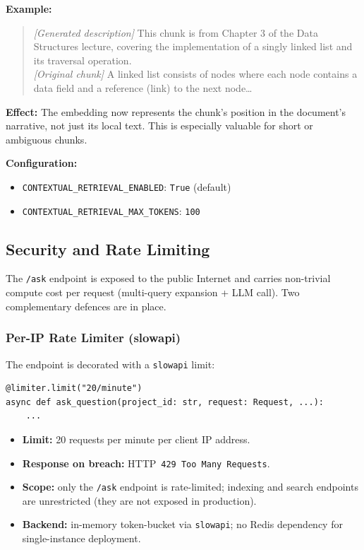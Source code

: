 \documentclass[12pt,a4paper]{article}
\begin{document}
\textbf{Example:}
\begin{quote}
\textit{[Generated description]} This chunk is from Chapter 3 of the Data Structures lecture, covering the implementation of a singly linked list and its traversal operation.\\[4pt]
\textit{[Original chunk]} A linked list consists of nodes where each node contains a data field and a reference (link) to the next node\ldots
\end{quote}

\textbf{Effect:} The embedding now represents the chunk's position in the document's narrative, not just its local text. This is especially valuable for short or ambiguous chunks.

\textbf{Configuration:}
\begin{itemize}
  \item \texttt{CONTEXTUAL\_RETRIEVAL\_ENABLED}: \texttt{True} (default)
  \item \texttt{CONTEXTUAL\_RETRIEVAL\_MAX\_TOKENS}: \texttt{100}
\end{itemize}

\subsection{Security and Rate Limiting}

The \texttt{/ask} endpoint is exposed to the public Internet and carries non-trivial compute cost per request (multi-query expansion + LLM call). Two complementary defences are in place.

\subsubsection*{Per-IP Rate Limiter (slowapi)}

The endpoint is decorated with a \texttt{slowapi} limit:

\begin{verbatim}
@limiter.limit("20/minute")
async def ask_question(project_id: str, request: Request, ...):
    ...
\end{verbatim}

\begin{itemize}
  \item \textbf{Limit:} 20 requests per minute per client IP address.
  \item \textbf{Response on breach:} HTTP~\texttt{429 Too Many Requests}.
  \item \textbf{Scope:} only the \texttt{/ask} endpoint is rate-limited; indexing and search endpoints are unrestricted (they are not exposed in production).
  \item \textbf{Backend:} in-memory token-bucket via \texttt{slowapi}; no Redis dependency for single-instance deployment.
\end{itemize}
\end{document}
